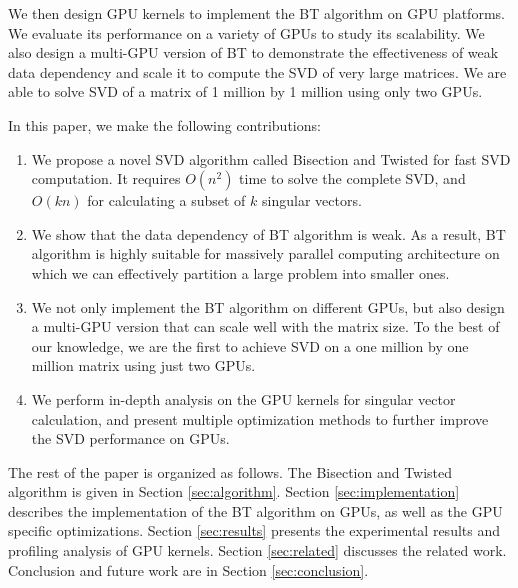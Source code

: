 We then design GPU kernels to implement the BT algorithm on GPU platforms. We evaluate its performance on a variety of GPUs to study its scalability. 
We also design a multi-GPU version of BT to demonstrate 
the effectiveness of weak data dependency and scale it
to compute the SVD of very large matrices. We are able to solve
SVD of a matrix of 1 million by 1 million using only two GPUs. 

In this paper, we make the following contributions:
\begin{enumerate}
\item We propose a novel SVD algorithm called Bisection and Twisted for fast SVD computation. It requires $O(n^2)$ time to solve the complete SVD, and $O(kn)$
for calculating a subset of $k$ singular vectors.
\item We show that the data dependency of BT algorithm is weak.
As a result, BT algorithm is highly suitable for massively parallel computing architecture on which we can effectively partition a large problem into smaller ones.
\item We not only implement the BT algorithm on different GPUs, but also design a multi-GPU version that can scale well with the matrix size. To the best of our knowledge, we are the first to achieve SVD on a one million by one million matrix using just two GPUs.
\item We perform in-depth analysis on the GPU kernels for singular vector calculation, and present multiple optimization methods to further improve the SVD performance on GPUs.
\end{enumerate}

The rest of the paper is organized as follows.
The Bisection and Twisted algorithm is given in Section \ref{sec:algorithm}.
Section \ref{sec:implementation} describes the implementation of the BT algorithm on GPUs, as well as the GPU specific optimizations.
Section \ref{sec:results} presents the experimental results and profiling analysis of GPU kernels.
Section \ref{sec:related} discusses the related work.
Conclusion and future work are in Section \ref{sec:conclusion}.

